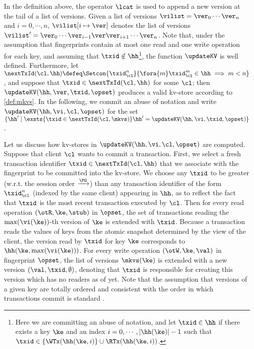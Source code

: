 In the definition above, the operator $\lcat$ is used to append a new version at the tail of 
a list of versions. Given a list of versions $\vilist = \ver_0\cdots \ver_n$ and $i=0,\cdots,n$, 
$\vilist[i \mapsto \ver]$ denotes the list of versions $\vilist' = \ver_0 \cdots \ver_{i-1} \ver \ver_{i+1} \cdots 
\ver_{n}$. 
Note that, under the assumption that fingerprints contain at most one read and one write 
operation for each key, and assuming that $\txid \notin \hh$\footnote{
Here we are committing an abuse of notation, and let $\txid \in \hh$ if there exists a key 
$\ke$ and an index $i=0,\cdots, \lvert \hh(\ke) \rvert -1$ such that $\txid \in \{\WTx(\hh(\ke, i)\} 
\cup \RTx(\hh(\ke, i))$.}, 
the function $\updateKV$ is well defined. Furthermore, 
let $\nextTxId(\cl, \hh) \defeq
\Setcon{\txid_{\cl}^{n}}{\fora{m} \txid_{\cl}^{m} \in \hh \implies m < n }$, 
and suppose that $\txid \in \nextTxId(\cl, \hh)$ for some $\cl$;
then $\updateKV(\hh, \ver, \txid, \opset)$ produces a valid kv-store according to \cref{def:mkvs}.
In the following, we commit an abuse of notation and write $\updateKV(\hh, \vi, \cl, \opset)$ 
for the set $\{\hh' \mid \exsts { \txid \in \nextTxId(\cl, \mkvs) } \hh' = \updateKV(\hh, \vi, \txid, \opset)\}$.

Let us discuss how kv-stores in $\updateKV(\hh, \vi, \cl, \opset)$ are computed. 
Suppose that client \( \cl \) wants to commit a transaction.
First, we select a fresh transaction identifier $\txid \in \nextTxId(\cl, \hh)$ that we associate 
with the fingerprint to be committed into the kv-store. We choose any $\txid$ to be 
greater (w.r.t. the session order $\xrightarrow{\PO}$) than any transaction identifier 
of the form $\txid_{\cl}^{n}$ (indexed by the same client) appearing in $\hh$,
as to reflect the fact that $\txid$ is the most recent transaction executed by $\cl$.
Then for every read operation $(\otR, \ke, \stub)$ in $\opset$,
the set of transactions reading the  $\max(\vi(\ke))$-th version of $\ke$ is extended with $\txid$.
Because a transaction reads the values of keys from the atomic 
snapshot determined by the view of the client, the version read by $\txid$ for key $\ke$ 
corresponds to $\hh(\ke, \max(\vi(\ke)))$.
For every write operation $(\otW, \ke, \val)$ in fingerprint $\opset$, 
the list of versions $\mkvs(\ke)$ is extended with a new version $(\val, \txid, \emptyset)$, 
denoting that $\txid$ is responsible for creating this version which has no readers as of yet. 
Note that the assumption that versions of 
a given key are totally ordered and consistent with the order in which 
transactions commit is standard \cite{adya,framework-concur,seebelieve}. 

